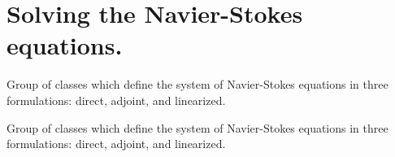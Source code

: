 \hypertarget{group__Navier__Stokes__Equations}{}\section{Solving the Navier-\/\+Stokes\textquotesingle{} equations.}
\label{group__Navier__Stokes__Equations}


Group of classes which define the system of Navier-\/\+Stokes equations in three formulations\+: direct, adjoint, and linearized.  


Group of classes which define the system of Navier-\/\+Stokes equations in three formulations\+: direct, adjoint, and linearized. 

